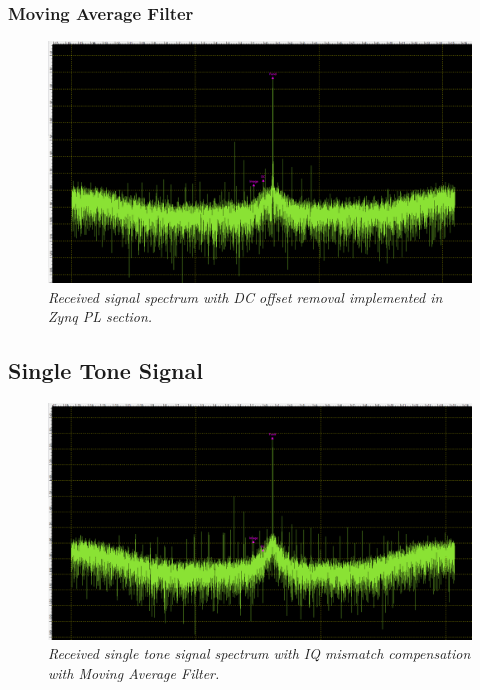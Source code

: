 \documentclass[en,printmode]{mgr}
\begin{document}
	 	\subsubsection*{Moving Average Filter}
	 	\begin{figure}[!htb]
    		\centering
   			\includegraphics[width=\textwidth]{plots/my_dc.png}
   		 	\caption{\textit{Received signal spectrum with DC offset removal implemented in Zynq PL
   		 	section.}}
   		\end{figure}
   		
		\subsection*{Single Tone Signal}
		\begin{figure}[!htb]
    		\centering
   			\includegraphics[width=\textwidth]{plots/my_single_mav.png}
   		 	\caption{\textit{Received single tone signal spectrum with IQ mismatch compensation with
   		 	Moving Average Filter.}}
   		\end{figure}
   		
\end{document}
